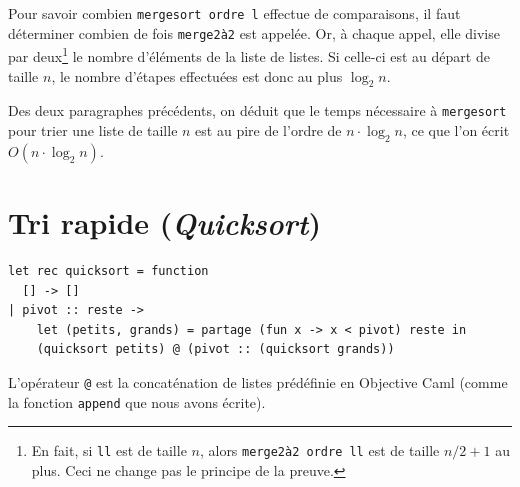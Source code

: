 \documentclass[11pt, a4paper]{article}
\begin{document}
Pour savoir combien \verb+mergesort ordre l+ effectue de comparaisons,
il faut déterminer combien de fois \verb+merge2à2+ est appelée. Or, à
chaque appel, elle divise par deux\footnote{En fait, si {\tt ll} est
de taille $n$, alors {\tt merge2à2 ordre ll} est de taille $n/2+1$ au
plus. Ceci ne change pas le principe de la preuve.}  le nombre
d'éléments de la liste de listes. Si celle-ci est au départ de taille
$n$, le nombre d'étapes effectuées est donc au plus $\log_2 n$.

Des deux paragraphes précédents, on déduit que le temps nécessaire à
\texttt{merge\-sort} pour trier une liste de taille $n$ est au pire de
l'ordre de $n \cdot\log_2 n$, ce que l'on écrit $O(n \cdot\log_2 n)$.

\section{Tri rapide (\emph{Quicksort})}

\begin{verbatim}
let rec quicksort = function
  [] -> []
| pivot :: reste ->
    let (petits, grands) = partage (fun x -> x < pivot) reste in
    (quicksort petits) @ (pivot :: (quicksort grands))
\end{verbatim}

L'opérateur \verb+@+ est la concaténation de listes prédéfinie en
Objective Caml (comme la fonction {\tt append} que nous avons écrite).
\end{document}
